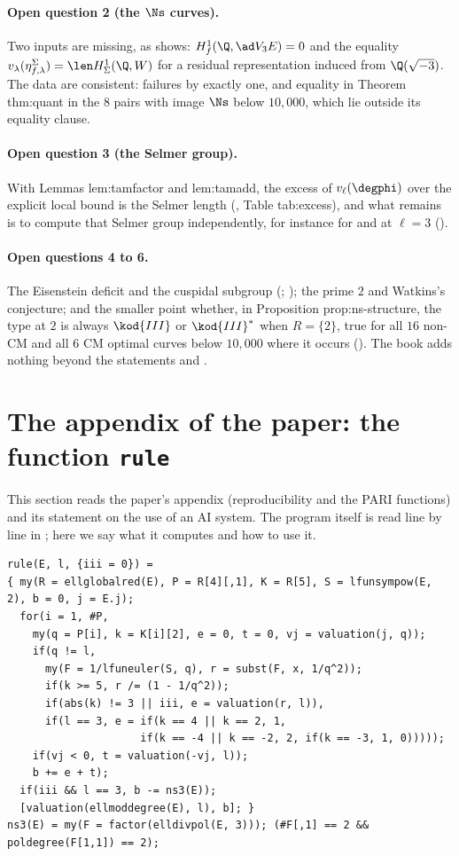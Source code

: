 \begin{sloppypar}
\paragraph{Open question 2 (the $\Ns$ curves).} Two inputs are missing, as  shows: $H^1_f(\Q,\ad V_3E)=0$ and the equality
$v_\lambda(\eta^\Sigma_{f,\lambda})=\len H^1_\Sigma(\Q,W)$ for a residual representation induced from $\Q(\sqrt{-3})$. The data are consistent: failures by exactly one, and equality in Theorem
thm:quant in the $8$ pairs with image $\Ns$ below $10{,}000$, which lie outside its equality clause.

\paragraph{Open question 3 (the Selmer group).} With Lemmas lem:tamfactor and lem:tamadd, the excess of $v_\ell(\degphi)$ over the explicit local bound is the Selmer length
(, Table tab:excess), and what remains is to compute that Selmer group independently, for instance for  and  at $\ell=3$
().

\paragraph{Open questions 4 to 6.} The Eisenstein deficit and the cuspidal subgroup (\cite{Mazur77}; ); the prime $2$ and Watkins's conjecture; and the smaller point
whether, in Proposition prop:ns-structure, the type at $2$ is always $\kod{III}$ or $\kod{III}^*$ when $R=\{2\}$, true for all $16$ non-CM and all $6$ CM optimal curves below $10{,}000$ where it
occurs (). The book adds nothing beyond the statements and .

\section[Paper appendix: \texttt{rule}]{The appendix of the paper: the function \texttt{rule}}\label{sec:paper:appendix}

This section reads the paper's appendix (reproducibility and the PARI functions) and its statement on the use of an AI system. The program itself is read line by line in
; here we say what it computes and how to use it.

\begin{lstlisting}[language=GP]
rule(E, l, {iii = 0}) =
{ my(R = ellglobalred(E), P = R[4][,1], K = R[5], S = lfunsympow(E, 2), b = 0, j = E.j);
  for(i = 1, #P,
    my(q = P[i], k = K[i][2], e = 0, t = 0, vj = valuation(j, q));
    if(q != l,
      my(F = 1/lfuneuler(S, q), r = subst(F, x, 1/q^2));
      if(k >= 5, r /= (1 - 1/q^2));
      if(abs(k) != 3 || iii, e = valuation(r, l)),
      if(l == 3, e = if(k == 4 || k == 2, 1,
                     if(k == -4 || k == -2, 2, if(k == -3, 1, 0)))));
    if(vj < 0, t = valuation(-vj, l));
    b += e + t);
  if(iii && l == 3, b -= ns3(E));
  [valuation(ellmoddegree(E), l), b]; }
ns3(E) = my(F = factor(elldivpol(E, 3))); (#F[,1] == 2 && poldegree(F[1,1]) == 2);
\end{lstlisting}


\end{sloppypar}
